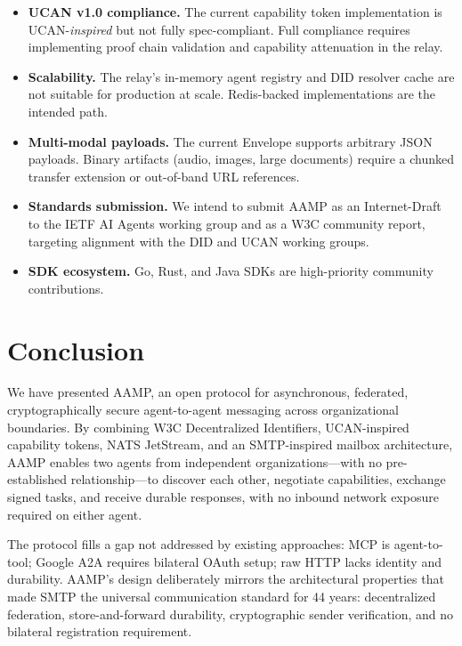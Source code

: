 \documentclass[11pt,a4paper]{article}
\begin{document}
\begin{itemize}[leftmargin=*]
  \item \textbf{UCAN v1.0 compliance.} The current capability token implementation
    is UCAN-\emph{inspired} but not fully spec-compliant. Full compliance requires
    implementing proof chain validation and capability attenuation in the relay.
  \item \textbf{Scalability.} The relay's in-memory agent registry and DID resolver
    cache are not suitable for production at scale. Redis-backed implementations are
    the intended path.
  \item \textbf{Multi-modal payloads.} The current Envelope supports arbitrary JSON
    payloads. Binary artifacts (audio, images, large documents) require a chunked
    transfer extension or out-of-band URL references.
  \item \textbf{Standards submission.} We intend to submit AAMP as an
    Internet-Draft to the IETF AI Agents working group and as a W3C community
    report, targeting alignment with the DID and UCAN working groups.
  \item \textbf{SDK ecosystem.} Go, Rust, and Java SDKs are high-priority community
    contributions.
\end{itemize}

\section{Conclusion}
\label{sec:conclusion}

We have presented AAMP, an open protocol for asynchronous, federated, cryptographically
secure agent-to-agent messaging across organizational boundaries. By combining W3C
Decentralized Identifiers, UCAN-inspired capability tokens, NATS JetStream, and an
SMTP-inspired mailbox architecture, AAMP enables two agents from independent
organizations---with no pre-established relationship---to discover each other, negotiate
capabilities, exchange signed tasks, and receive durable responses, with no inbound
network exposure required on either agent.

The protocol fills a gap not addressed by existing approaches: MCP is agent-to-tool;
Google A2A requires bilateral OAuth setup; raw HTTP lacks identity and durability.
AAMP's design deliberately mirrors the architectural properties that made SMTP the
universal communication standard for 44 years: decentralized federation, store-and-forward
durability, cryptographic sender verification, and no bilateral registration requirement.
\end{document}

